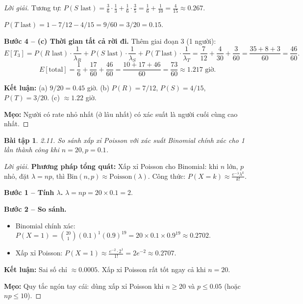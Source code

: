 \documentclass[8pt,a4paper]{article}
\newtheorem{exercise}{Bài tập}
\newenvironment{solution}{\begin{proof}[Lời giải]}{\end{proof}}
\begin{document}
\begin{solution}
Tương tự: $P(S \text{ last}) = \frac{3}{6} \cdot \frac{1}{3} + \frac{1}{6} \cdot \frac{3}{5} = \frac{1}{6} + \frac{1}{10} = \frac{4}{15} \approx 0.267$.

$P(T \text{ last}) = 1 - 7/12 - 4/15 = \boxed{9/60 = 3/20 = 0.15}$.

\textbf{Bước 4 -- (c) Thời gian tất cả rời đi.} Thêm giai đoạn 3 (1 người):
\[
  E[T_3] = P(R\text{ last}) \cdot \frac{1}{\lambda_R} + P(S\text{ last}) \cdot \frac{1}{\lambda_S} + P(T\text{ last}) \cdot \frac{1}{\lambda_T} = \frac{7}{12} + \frac{4}{30} + \frac{3}{60} = \frac{35+8+3}{60} = \frac{46}{60}.
\]
\[
  E[\text{total}] = \frac{1}{6} + \frac{17}{60} + \frac{46}{60} = \frac{10+17+46}{60} = \boxed{\frac{73}{60} \approx 1.217 \text{ giờ}}.
\]

\textbf{Kết luận:} (a) $9/20 = 0.45$ giờ. (b) $P(R) = 7/12$, $P(S) = 4/15$, $P(T) = 3/20$. (c) $\approx 1.22$ giờ.

\textbf{Mẹo:} Người có rate nhỏ nhất (ở lâu nhất) có xác suất là người cuối cùng cao nhất.
\end{solution}

\begin{exercise}
2.11. So sánh xấp xỉ Poisson với xác suất Binomial chính xác cho 1 lần thành công khi $n = 20, p = 0.1$.
\end{exercise}
\begin{solution}
\textbf{Phương pháp tổng quát:} Xấp xỉ Poisson cho Binomial: khi $n$ lớn, $p$ nhỏ, đặt $\lambda = np$, thì $\text{Bin}(n,p) \approx \text{Poisson}(\lambda)$. Công thức: $P(X=k) \approx \frac{e^{-\lambda}\lambda^k}{k!}$.

\textbf{Bước 1 -- Tính $\lambda$.} $\lambda = np = 20 \times 0.1 = 2$.

\textbf{Bước 2 -- So sánh.}
\begin{itemize}[nosep]
  \item Binomial chính xác: $P(X=1) = \binom{20}{1}(0.1)^1(0.9)^{19} = 20 \times 0.1 \times 0.9^{19} \approx 0.2702$.
  \item Xấp xỉ Poisson: $P(X=1) \approx \frac{e^{-2} \cdot 2^1}{1!} = 2e^{-2} \approx 0.2707$.
\end{itemize}

\textbf{Kết luận:} Sai số chỉ $\approx 0.0005$. Xấp xỉ Poisson rất tốt ngay cả khi $n = 20$.

\textbf{Mẹo:} Quy tắc ngón tay cái: dùng xấp xỉ Poisson khi $n \geq 20$ và $p \leq 0.05$ (hoặc $np \leq 10$).
\end{solution}
\end{document}
